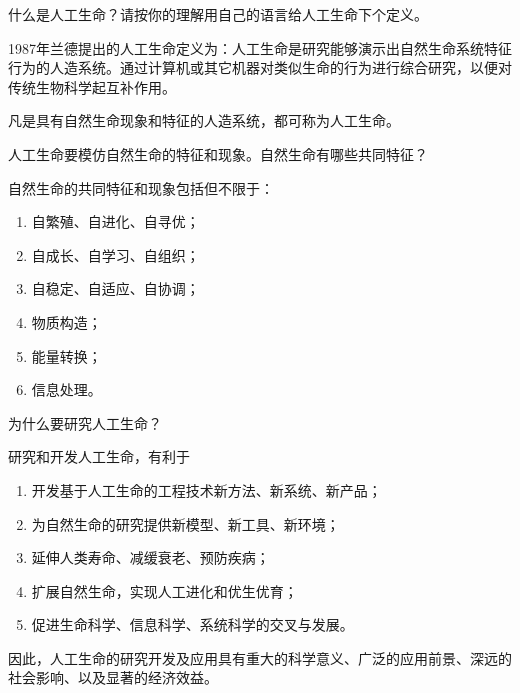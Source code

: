 \begin{question}
什么是人工生命？请按你的理解用自己的语言给人工生命下个定义。
\end{question}
\begin{solution}
1987年兰德提出的人工生命定义为：人工生命是研究能够演示出自然生命系统特征行为的人造系统。通过计算机或其它机器对类似生命的行为进行综合研究，以便对传统生物科学起互补作用。\par
凡是具有自然生命现象和特征的人造系统，都可称为人工生命。
\end{solution}

\begin{question}
人工生命要模仿自然生命的特征和现象。自然生命有哪些共同特征？
\end{question}
\begin{solution}
自然生命的共同特征和现象包括但不限于：
	\begin{enumerate}
		\item 自繁殖、自进化、自寻优；
		\item 自成长、自学习、自组织；
		\item 自稳定、自适应、自协调；
		\item 物质构造；
		\item 能量转换；
		\item 信息处理。
	\end{enumerate}
\end{solution}

\begin{question}
为什么要研究人工生命？
\end{question}
\begin{solution}
研究和开发人工生命，有利于
	\begin{enumerate}
		\item 开发基于人工生命的工程技术新方法、新系统、新产品；
		\item 为自然生命的研究提供新模型、新工具、新环境；
		\item 延伸人类寿命、减缓衰老、预防疾病；
		\item 扩展自然生命，实现人工进化和优生优育；
		\item 促进生命科学、信息科学、系统科学的交叉与发展。
	\end{enumerate} \par
	因此，人工生命的研究开发及应用具有重大的科学意义、广泛的应用前景、深远的社会影响、以及显著的经济效益。
\end{solution}


